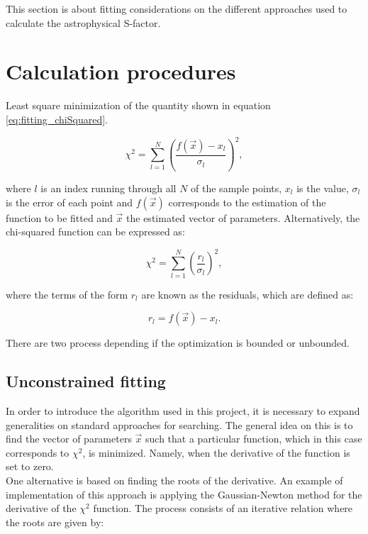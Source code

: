 \documentclass[openany]{book}
\begin{document}
This section is about fitting considerations on the different approaches used to calculate the astrophysical S-factor.

\section{Calculation procedures} \label{sec:calculationFitting}

Least square minimization of the quantity shown in equation \ref{eq:fitting_chiSquared}.

\begin{equation} \label{eq:fitting_chiSquared}
	\chi^2  = \sum_{l=1}^{N} {\left(\frac{f(\vec x) - x_l}{\sigma_l}\right)^2},
\end{equation}

where $l$ is an index running through all $N$ of the sample points, $x_l$ is the value, $\sigma_l$ is the error of each point and $f(\vec x)$ corresponds to the estimation of the function to be fitted and $\vec x$ the estimated vector of parameters. Alternatively, the chi-squared function can be expressed as: 

\begin{equation} \label{eq:fitting_chiSquared_residuals}
	\chi^2  = \sum_{l=1}^{N} {\left(\frac{r_l}{\sigma_l}\right)^2},
\end{equation}

where the terms of the form $r_l$ are known as the residuals, which are defined as:

\begin{equation} \label{eq:fitting_residuals}
	r_l = f(\vec x) - x_l.
\end{equation}

There are two process depending if the optimization is bounded or unbounded.

\subsection{Unconstrained fitting} \label{sub:unconstrainedFitting}

In order to introduce the algorithm used in this project, it is necessary to expand generalities on standard approaches for searching. The general idea on this is to find the vector of parameters $\vec x$ such that a particular function, which in this case corresponds to $\chi^2$, is minimized. Namely, when the derivative of the function is set to zero. \\

One alternative is based on finding the roots of the derivative. An example of implementation of this approach is applying the Gaussian-Newton method for the derivative of the $\chi^2$ function. The process consists of an iterative relation where the roots are given by:
\end{document}
